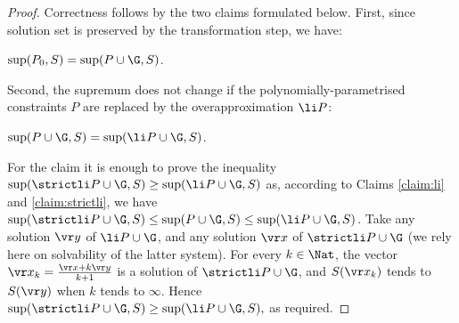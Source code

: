 \begin{proof}
Correctness follows by the two claims formulated below. 
First, since solution set is preserved by the transformation step, we have:
%
\begin{claim} \label{claim:proof1}
$\sup (P_0, S) = \sup (P \cup \G, S)$.
\end{claim}
%
\noindent
Second, the supremum does not change if
the polynomially-parametrised constraints $P$ are replaced by the 
overapproximation $\li P$:
%
\begin{claim} \label{claim:proof2}
$\sup (P\cup\G, S) =  \sup (\li P \cup \G, S)$. 
\end{claim}
%
\noindent
%
For the claim it is enough to prove the inequality
$
\sup (\strictli P\cup\G, S) \geq  \sup (\li P \cup \G, S)
$
as, according to Claims \ref{claim:li} and \ref{claim:strictli}, we have
$\sup (\strictli P \cup \G, S) \leq \sup (P\cup\G, S) \leq  \sup (\li P \cup \G, S)$.
Take any solution $\vr y$ of $\li P\cup\G$, and any solution 
$\vr x$ of $\strictli P\cup\G$ (we rely here on solvability of the latter system).
For every $k\in\Nat$, the vector
$\vr x_k = \frac{\vr x + k \vr y}{k+1}$ is a solution of $\strictli P\cup\G$, and $S(\vr x_k)$
tends to $S(\vr y)$ when $k$ tends to $\infty$.
Hence 
$
\sup (\strictli P\cup\G, S) \geq  \sup (\li P \cup \G, S),
$
as required.
%
%
\end{proof}

